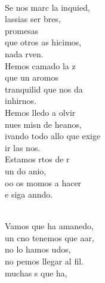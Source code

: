 \documentclass[12pt]{article}
\begin{document}
\begin{multicols*}{2}
\begin{cancion}%
	       \chord{(}{**)}{    }\\
	Se nos marc la inquied, \\
	lassias  ser bres,\\
	promesas\\
	que otros as hicimos,\\
	 nada rven.\\
	Hemos camado la z\\
	que un aromos\\
	  tranquilid que nos da\\
	 inhirnos.\\
\jump
	Hemos lledo a olvir\\
	nues misn de heanos, \\
	ivando todo allo que exige\\
	ir las nos.\\
	Estamos rtos de r\\
	un do anio,\\
	oo os momos a hacer\\
	e siga anndo.\\\jump\\
	\begin{chorus}%
	Vamos que  ha amanedo,\\
	un cno tenemos que aar,\\
	no lo hamos udos,\\
	no pemos llegar al fil.\\
	 muchas s que ha,\\

\end{chorus}
\end{cancion}
\end{multicols*}
\end{document}
